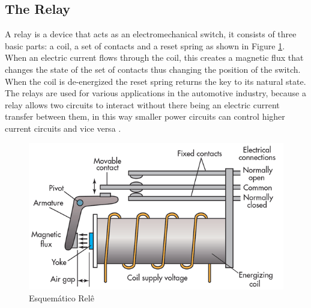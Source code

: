 \subsection{The Relay}
	A relay is a device that acts as an electromechanical switch, it consists of three basic parts: a coil, a set of contacts and a reset spring as shown in Figure \ref{fig-relay}. When an electric current flows through the coil, this creates a magnetic flux that changes the state of the set of contacts thus changing the position of the switch. When the coil is de-energized the reset spring returns the key to its natural state. The relays are used for various applications in the automotive industry, because a relay allows two circuits to interact without there being an electric current transfer between them, in this way smaller power circuits can control higher current circuits and vice versa \cite{keller1962relays} .

	\begin{figure}[htbp]
		\centering
			\includegraphics[scale=0.45]{figuras/fig-relay.png}
			\caption{Esquemático Relê \cite{relay-scheme}}
		\label{fig-relay}
	\end{figure}
